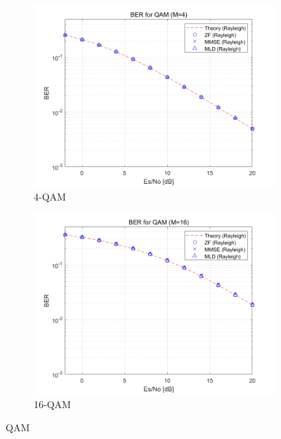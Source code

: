 \documentclass{article}
\begin{document}
\begin{figure}[H]
	\centering
	\begin{subfigure}{0.5\textwidth}
		\centerline{\includegraphics[width=1\textwidth]{4-qam.png}}
		\caption{4-QAM}
	\end{subfigure}%
	\begin{subfigure}{0.5\textwidth}
		\centerline{\includegraphics[width=1\textwidth]{16-qam.png}}
		\caption{16-QAM}
	\end{subfigure}%
	\caption{QAM}
\end{figure}
\end{document}
